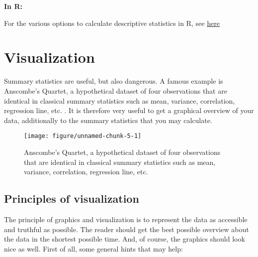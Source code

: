 \documentclass[a4paper,twoside]{tufte-book}\usepackage[]{graphicx}\usepackage[]{color}
\makeatletter
\def\maxwidth{ %
  \ifdim\Gin@nat@width>\linewidth
    \linewidth
  \else
    \Gin@nat@width
  \fi
}
\makeatother
\begin{document}
{\vspace{1cm}
\begin{fullwidth}
\begin{mdframed}
    
\textbf{In R:} 

For the various options to calculate descriptive statistics in R, see \href{http://www.uni-kiel.de/psychologie/rexrepos/rerDescriptive.html}{here}

\end{mdframed}
\end{fullwidth} 


\section{Visualization}


Summary statistics are useful, but also dangerous. A famous example is Anscombe's Quartet, a hypothetical dataset of four observations that are identical in classical summary statistics such as mean, variance, correlation, regression line, etc. \citep{Anscombe-Graphsinstatistical-1973}. It is therefore very useful to get a graphical overview of your data, additionally to the summary statistics that you may calculate.

\begin{figure}[htbp]
\begin{center}
\begin{Schunk}

\texttt{[image: figure/unnamed-chunk-5-1]} \end{Schunk}
\caption{Anscombe's Quartet, a hypothetical dataset of four observations that are identical in classical summary statistics such as mean, variance, correlation, regression line, etc.}
\label{fig: Anscombes Quartet}
\end{center}
\end{figure}


\subsection{Principles of visualization}

The principle of graphics and visualization is to represent the data as accessible and truthful as possible. The reader should get the best possible overview about the data in the shortest possible time. And, of course, the graphics should look nice as well. First of all, some general hints that may help:

}
\end{document}
